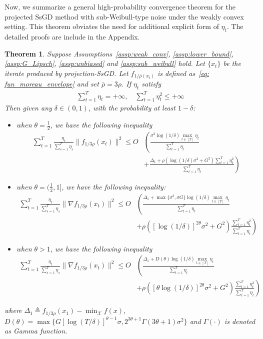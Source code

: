 \documentclass{article}
\newtheorem{theorem}{Theorem}
\def \X {\mathcal{X}}
\begin{document}
Now, we summarize a general high-probability convergence theorem for the projected SsGD method with sub-Weibull-type noise under the weakly convex setting. This theorem obviates the need for additional explicit form of $\eta_t$. The detailed proofs are include in the Appendix.

\begin{theorem}\label{thm: SsGD}
    Suppose Assumptions~\ref{assp:weak_conv}, \ref{assp:lower_bound}, \ref{assp:G_Lipsch}, \ref{assp:unbiased} and \ref{assp:sub_weibull} hold. Let $\{x_t\}$ be the iterate produced by projection-SsGD. Let $f_{1/\bar{\rho}(x_t)}$ is defined as~\eqref{eq: fun_moreau_envelope} and set $\bar{\rho}=3\rho$. If $\eta_t$ satisfy 
    \begin{align}
        \sum_{t=1}^T \eta_t = +\infty,\quad \sum_{t=1}^T\eta_t^2 \leq +\infty
    \end{align}
    Then given any $\delta\in(0,1)$, with the probability at least $1-\delta$:
        \begin{itemize}
        \item when $\theta=\frac{1}{2}$, we have the following inequality
            \begin{align}
                \sum_{t=1}^T \frac{\eta_t}{\sum_{s=1}^T\eta_s} \|f_{1/3\rho}(x_t)\|^2 \le O&\left(\frac{\sigma^2\log(1/\delta)\max_{t\in[T]}\eta_t}{\sum_{t=1}^T\eta_t}\right.\nonumber\\
        &\left.+\frac{\Delta_1+\rho(\log(1/\delta)\sigma^2+G^2)\sum_{t=1}^T\eta_t^2}{\sum_{t=1}^T\eta_t}\right)
            \end{align}
            \item when $\theta = (\frac{1}{2},1]$, we have the following inequality:
            \begin{align}
                \sum_{t=1}^T\frac{\eta_t}{\sum_{s=1}^T\eta_s}\|\nabla f_{1/3\rho}(x_t)\|^2\leq O&\left(\frac{\Delta_1+\max\{\sigma^2,\sigma G\}\log(1/\delta)\max_{t\in[T]}\eta_t}{\sum_{t=1}^T\eta_t}\right.\nonumber\\
                &\left.+\rho([\log(1/\delta)]^{2\theta}\sigma^2+G^2)\frac{\sum_{t=1}^T\eta_t^2}{\sum_{t=1}^T\eta_t}\right)
            \end{align}
            \item when $\theta>1$, we have the following inequality
            \begin{align}
                \sum_{t=1}^T\frac{\eta_t}{\sum_{s=1}^T\eta_s}\|\nabla f_{1/3\rho}(x_t)\|^2\leq O&\left(\frac{\Delta_1+D(\theta)\log(1/\delta)\max_{t\in[T]}\eta_t}{\sum_{t=1}^T\eta_t}\right.\nonumber\\
        &\left.+\rho([\theta\log(1/\delta)]^{2\theta}\sigma^2+G^2)\frac{\sum_{t=1}^T\eta_t^2}{\sum_{t=1}^T\eta_t}\right)
            \end{align}
        \end{itemize}
    where $\Delta_1\triangleq f_{1/3\rho}(x_1)-\min_\X f(x)$, $D(\theta)=\max\{ G[\log(T/\delta)]^{\theta-1}\sigma,2^{3\theta+1}\Gamma(3\theta+1)\sigma^2\}$ and $\Gamma(\cdot)$ is denoted as \textit{Gamma function}.
\end{theorem}
\end{document}
